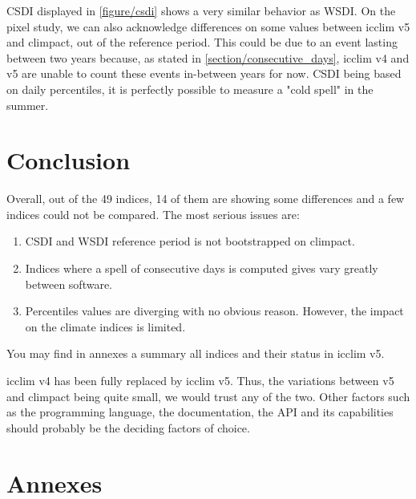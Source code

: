 \documentclass[a4paper,11pt]{article}
\begin{document}
        CSDI displayed in \ref{figure/csdi} shows a very similar behavior as WSDI.
        On the pixel study, we can also acknowledge differences on some values between icclim v5 and climpact, out of the reference period.
        This could be due to an event lasting between two years because, as stated in \ref{section/consecutive_days}, icclim v4 and v5 are unable to count these events in-between years for now.
        CSDI being based on daily percentiles, it is perfectly possible to measure a "cold spell" in the summer. 

\part{Conclusion}
    Overall, out of the 49 indices, 14 of them are showing some differences and a few indices could not be compared.
    The most serious issues are:
    \begin{enumerate}
        \item CSDI and WSDI reference period is not bootstrapped on climpact.
        \item Indices where a spell of consecutive days is computed gives vary greatly between software.
        \item Percentiles values are diverging with no obvious reason. However, the impact on the climate indices is limited.
    \end{enumerate}
    You may find in annexes a summary all indices and their status in icclim v5.

    icclim v4 has been fully replaced by icclim v5.
    Thus, the variations between v5 and climpact being quite small, we would trust any of the two.
    Other factors such as the programming language, the documentation, the API and its capabilities should probably be the deciding factors of choice.


\part{Annexes}
\end{document}
